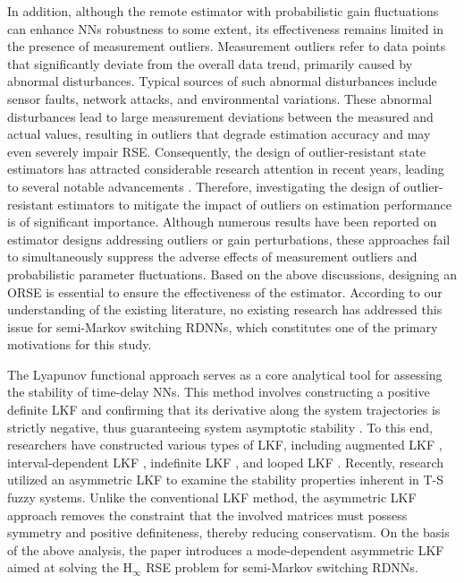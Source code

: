 \documentclass[preprint,review,fleqn,sort&compress,3p]{elsarticle}
\theoremstyle{definition}%
\begin{document}
 	In addition, although the remote estimator with probabilistic gain fluctuations can enhance NNs robustness to some extent, its effectiveness remains limited in the presence of measurement outliers. Measurement outliers refer to data points that significantly deviate from the overall data trend, {\color{red}primarily caused by abnormal disturbances. Typical sources of such abnormal disturbances include sensor faults, network attacks, and environmental variations. These abnormal disturbances lead to large measurement deviations between the measured and actual values, resulting in outliers that degrade estimation accuracy and may even severely impair RSE.} Consequently,  the design of outlier-resistant state estimators has attracted considerable research attention in recent years, leading to several notable advancements \cite{li2021outlierresistant,cheng2023outlierresistant,fang2023outlierresistant}.{\color{red} Therefore, investigating the design of outlier-resistant estimators to mitigate the impact of outliers on estimation performance is of significant importance. Although numerous results have been reported on estimator designs addressing outliers or gain perturbations, these approaches fail to simultaneously suppress the adverse effects of measurement outliers and probabilistic parameter fluctuations.} Based on the above discussions, designing an ORSE is essential to ensure the effectiveness of the estimator. According to our understanding of the existing literature, no existing research has addressed this issue for semi-Markov switching RDNNs, which constitutes one of the primary motivations for this study.
	
	The Lyapunov functional approach serves as a core analytical tool for assessing the stability of time-delay NNs. This method involves constructing a positive definite LKF and confirming that its derivative along the system trajectories is strictly negative, thus guaranteeing system asymptotic stability \cite{lin2023stability}. To this end, researchers have constructed various types of LKF, including augmented LKF \cite{zhang2024mixeddelaybased}, interval-dependent LKF \cite{ni2023intermittenta}, indefinite LKF \cite{li2025fixed}, and looped LKF \cite{ganesan2024synchronizationa}. Recently, research \cite{sheng2022asymmetric} utilized an asymmetric LKF to examine the stability properties inherent in T-S fuzzy systems. Unlike the conventional LKF method, the asymmetric LKF approach removes the constraint that the involved matrices must possess symmetry and positive definiteness, thereby reducing conservatism. On the basis of the above analysis, the paper introduces a mode-dependent asymmetric LKF aimed at solving the $\text{H}_\infty$ RSE problem for semi-Markov switching RDNNs.
	
\end{document}
